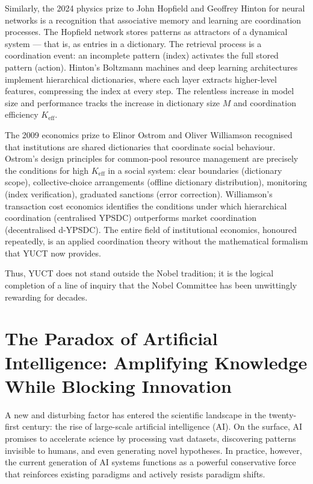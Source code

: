 \documentclass[12pt,a4paper]{article}
\begin{document}
	Similarly, the 2024 physics prize to John Hopfield and Geoffrey Hinton for neural networks is a recognition that associative memory and learning are coordination processes. The Hopfield network stores patterns as attractors of a dynamical system — that is, as entries in a dictionary. The retrieval process is a coordination event: an incomplete pattern (index) activates the full stored pattern (action). Hinton's Boltzmann machines and deep learning architectures implement hierarchical dictionaries, where each layer extracts higher-level features, compressing the index at every step. The relentless increase in model size and performance tracks the increase in dictionary size \(M\) and coordination efficiency \(K_{\mathrm{eff}}\).
	
	The 2009 economics prize to Elinor Ostrom and Oliver Williamson recognised that institutions are shared dictionaries that coordinate social behaviour. Ostrom's design principles for common-pool resource management are precisely the conditions for high \(K_{\mathrm{eff}}\) in a social system: clear boundaries (dictionary scope), collective-choice arrangements (offline dictionary distribution), monitoring (index verification), graduated sanctions (error correction). Williamson's transaction cost economics identifies the conditions under which hierarchical coordination (centralised YPSDC) outperforms market coordination (decentralised d-YPSDC). The entire field of institutional economics, honoured repeatedly, is an applied coordination theory without the mathematical formalism that YUCT now provides.
	
	Thus, YUCT does not stand outside the Nobel tradition; it is the logical completion of a line of inquiry that the Nobel Committee has been unwittingly rewarding for decades.
	
	\section{The Paradox of Artificial Intelligence: Amplifying Knowledge While Blocking Innovation}
	
	A new and disturbing factor has entered the scientific landscape in the twenty-first century: the rise of large-scale artificial intelligence (AI). On the surface, AI promises to accelerate science by processing vast datasets, discovering patterns invisible to humans, and even generating novel hypotheses. In practice, however, the current generation of AI systems functions as a powerful conservative force that reinforces existing paradigms and actively resists paradigm shifts.
	
\end{document}

